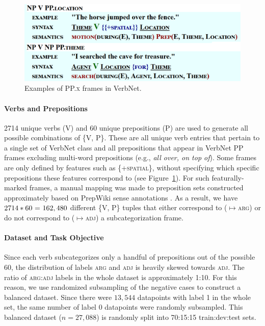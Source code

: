 \documentclass[letterpaper]{article} %
\begin{document}
\begin{figure}[h]
\centering
\includegraphics[width=0.9\linewidth]{ppframes}
\caption{Examples of \textsc{PP.x} frames in VerbNet.}
\label{fig:ppframes}
\end{figure}

\paragraph{Verbs and Prepositions} 2714 unique verbs (V) and 60 unique prepositions (P) are used to generate all possible combinations of \{\textsc{V, P}\}. These are all unique verb entries that pertain to a single set of VerbNet class and all prepositions that appear in VerbNet PP frames excluding multi-word prepositions (e.g., \textit{all over, on top of}). Some frames are only defined by features such as \textsc{\{+spatial\}}, without specifying which specific prepositions these features correspond to (see Figure~\ref{fig:ppframes}). For such featurally-marked frames, a manual mapping was made to preposition sets constructed approximately based on PrepWiki sense annotations \cite{schneider2015hierarchy}. As a result, we have $2714*60\textnormal{ = }162,480$ different \textsc{\{V, P\}} tuples that either correspond to ($\mapsto$\textsc{arg}) or do not correspond to ($\mapsto$\textsc{adj}) a subcategorization frame.

\paragraph{Dataset and Task Objective}  Since each verb subcategorizes only a handful of prepositions out of the possible 60, the distribution of labels \textsc{arg} and \textsc{adj} is heavily skewed towards \textsc{adj}. The ratio of \textsc{arg}:\textsc{adj} labels in the whole dataset is approximately 1:10. For this reason, we use randomized subsampling of the negative cases to construct a balanced dataset. Since there were $13,544$ datapoints with label 1 in the whole set, the same number of label 0 datapoints were randomly subsampled. This balanced dataset ($n=27,088$) is randomly split into 70:15:15 train:dev:test sets.
\end{document}
